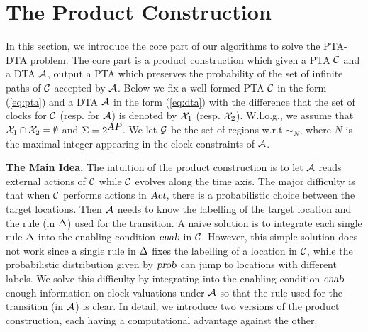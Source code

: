 \section{The Product Construction}
In this section, we introduce the core part of our algorithms to solve the {\sc PTA-DTA} problem. The core part is a product construction which given a PTA $\mathcal{C}$ and a DTA $\mathcal{A}$, output a PTA which preserves the probability of the set of infinite paths of $\mathcal{C}$ accepted by $\mathcal{A}$.
Below we fix a well-formed PTA $\mathcal{C}$ in the form (\ref{eq:pta}) and a DTA $\mathcal{A}$ in the form (\ref{eq:dta}) 
with the difference that the set of clocks for $\mathcal{C}$ (resp. for $\mathcal{A}$) is denoted by $\mathcal{X}_1$ (resp. $\mathcal{X}_2$).
W.l.o.g., we assume that $\mathcal{X}_1\cap\mathcal{X}_2=\emptyset$ and $\Sigma=2^{\mbox{\sl AP}}$.
We let $\mathcal{G}$ be the set of regions w.r.t $\sim_N$, where $N$ is the maximal integer appearing in the clock constraints of $\mathcal{A}$.

{\bf The Main Idea.} The intuition of the product construction is to let $\mathcal{A}$ reads external actions of $\mathcal{C}$ while $\mathcal{C}$ evolves along the time axis.
The major difficulty is that when $\mathcal{C}$ performs actions in $\mbox{\sl Act}$, there is a probabilistic choice between the target locations. Then $\mathcal{A}$ needs to know the labelling of the target location and the rule (in $\Delta$) used for the transition.
A naive solution is to integrate each single rule $\Delta$ into the enabling condition $\mbox{\sl enab}$ in $\mathcal{C}$. However, this simple solution does not work since a single rule in $\Delta$ fixes the labelling of a location in $\mathcal{C}$, while the probabilistic distribution given by $\mbox{\sl prob}$ can jump to locations with different labels.
We solve this difficulty by integrating into the enabling condition $\mbox{\sl enab}$ enough information on clock valuations under $\mathcal{A}$ so that the rule  used for the transition (in $\mathcal{A}$) is clear.
In detail, we introduce two versions of the product construction, each having a computational advantage against the other.

